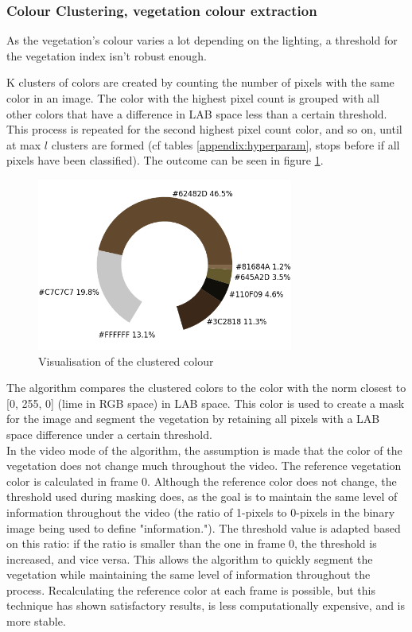 \subsubsection{Colour Clustering, vegetation colour extraction}

As the vegetation’s colour varies a lot depending on the lighting, a threshold for the vegetation index isn't robust enough. 

K clusters of colors are created by counting the number of pixels with the same color in an image. The color with the highest pixel count is grouped with all other colors that have a difference in LAB space less than a certain threshold. This process is repeated for the second highest pixel count color, and so on, until at max $l$ clusters are formed (cf tables \ref{appendix:hyperparam}, stops before if all pixels have been classified). The outcome can be seen in figure \ref{pics:ColourClus}.

\begin{figure}[H]
   \centering
   \includegraphics[width=0.75\textwidth]{images/donut.png}
   \caption{Visualisation of the clustered colour}
   \label{pics:ColourClus}
\end{figure}

The algorithm compares the clustered colors to the color with the norm closest  to [0, 255, 0] (lime in RGB space) in LAB space. This color is used to create a mask for the image and segment the vegetation by retaining all pixels with a LAB space difference under a certain threshold. \\


In the video mode of the algorithm, the assumption is made that the color of the vegetation does not change much throughout the video. The reference vegetation color is calculated in frame 0. Although the reference color does not change, the threshold used during masking does, as the goal is to maintain the same level of information throughout the video (the ratio of 1-pixels to 0-pixels in the binary image being used to define "information."). The threshold value is adapted based on this ratio: if the ratio is smaller than the one in frame 0, the threshold is increased, and vice versa. This allows the algorithm to quickly segment the vegetation while maintaining the same level of information throughout the process. Recalculating the reference color at each frame is possible, but this technique has shown satisfactory results, is less computationally expensive, and is more stable. 

